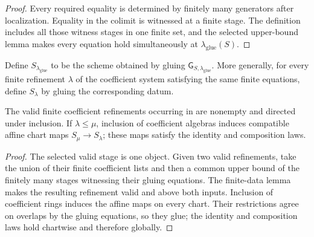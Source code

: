 \begin{proof}
  Every required equality is determined by finitely many generators after
  localization.  Equality in the colimit is witnessed at a finite stage.
  The definition includes all those witness stages in one finite set, and the
  selected upper-bound lemma makes every equation hold simultaneously at
  $\lambda_{\mathrm{glue}}(S)$.
\end{proof}

\begin{definition}
  \label{def:nagata-noetherian-stage}

  Define $S_{\lambda_{\mathrm{glue}}}$ to be the scheme obtained by gluing
  $\mathsf G_{S,\lambda_{\mathrm{glue}}}$.  More generally, for every finite
  refinement $\lambda$ of the coefficient system satisfying the same finite
  equations, define $S_\lambda$ by gluing the corresponding datum.
\end{definition}

\begin{lemma}
  \label{lemma:nagata-valid-refinements-directed}

  The valid finite coefficient refinements occurring in
   are nonempty and directed under
  inclusion.  If $\lambda\leq\mu$, inclusion of coefficient algebras induces
  compatible affine chart maps $S_\mu\to S_\lambda$; these maps satisfy the
  identity and composition laws.
\end{lemma}

\begin{proof}
  The selected valid stage is one object.  Given two valid refinements, take
  the union of their finite coefficient lists and then a common upper bound of
  the finitely many stages witnessing their gluing equations.  The finite-data
  lemma makes the resulting refinement valid and above both inputs.  Inclusion
  of coefficient rings induces the affine maps on every chart.  Their
  restrictions agree on overlaps by the gluing equations, so they glue; the
  identity and composition laws hold chartwise and therefore globally.
\end{proof}

